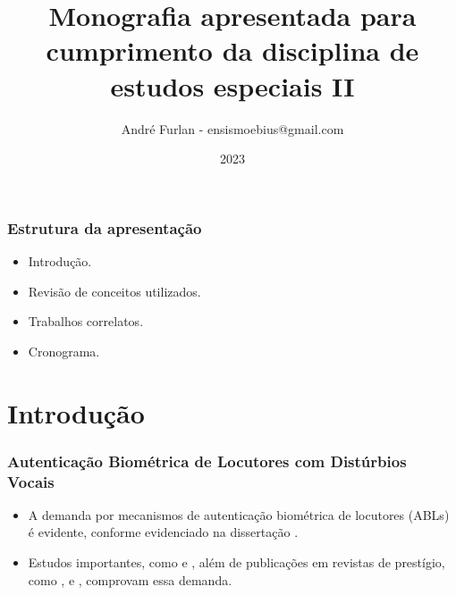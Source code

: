 \documentclass{beamer}
\title{Monografia apresentada para cumprimento da disciplina de estudos especiais II}
\author{André Furlan - ensismoebius@gmail.com}
\institute{Universidade Estadual Paulista Júlio de Mesquita Filho}
\date{2023}
\begin{document}
	
	\frame{\titlepage}
	\begin{frame}
		\frametitle{Estrutura da apresentação}
		\begin{itemize}
			\item Introdução.
			\item Revisão de conceitos utilizados.
			\item Trabalhos correlatos.
			\item Cronograma.
		\end{itemize}
	\end{frame}
	
	\section{Introdução}
	
	\begin{frame}
		\frametitle{Autenticação Biométrica de Locutores com Distúrbios Vocais}
		\begin{itemize}
			\item A demanda por mecanismos de autenticação biométrica de locutores (ABLs) é evidente, conforme evidenciado na dissertação \cite{furlan2021caracterizacao}.
			\item Estudos importantes, como \cite{beigi2011speaker} e \cite{neustein2012forensic}, além de publicações em revistas de prestígio, como \cite{hansen2015speaker}, \cite{wang2022racp} e \cite{lee2020two}, comprovam essa demanda.
		\end{itemize}
	\end{frame}
	
\end{document}
